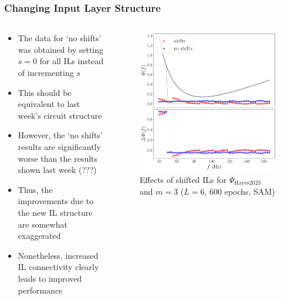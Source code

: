 \documentclass{beamer}
\begin{document}
\begin{frame}
\frametitle{Changing Input Layer Structure}
\begin{columns}
\begin{column}{0.5\textwidth}
\begin{itemize}
\item The data for `no shifts' was obtained by setting  $s=0$ for all ILs instead of incrementing $s$
\item This should be equivalent to last week's circuit structure 
\item However, the `no shifts' results are significantly worse than the results shown last week (\alert{???})
\item Thus, the improvements due to the new IL structure are somewhat exaggerated  
\item Nonetheless, \alert{increased IL connectivity clearly leads to improved performance}
\end{itemize}
\end{column}
\begin{column}{0.5\textwidth}
\begin{figure}
\centering 
\includegraphics[width=\textwidth]{im/phase_shift_comp_psi_m3}
\caption{Effects of shifted ILs for $\Psi_\text{Hayes2023}$ and $m=3$ ($L=6$, 600 epochs, SAM)}
\end{figure}
\end{column}
\end{columns}
\end{frame}
\end{document}
